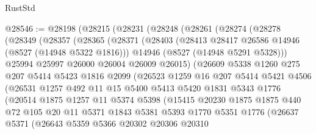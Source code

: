 \begin{lexlean}{RustStd}
\begin{coremodule}
@28546 := @28198
    (@28215
      (@28231
        (@28248
          (@28261
            (@28274
              (@28278
                (@28349
                  (@28357
                    (@28365
                      (@28371
                        (@28403
                          (@28413 @28417 @26586 @14946 (@8527 (@14948 @5322 @1816)))
                          @14946
                          (@8527 (@14948 @5291 @5328)))
                        @25994
                        @25997
                        @26000
                        @26004
                        @26009
                        @26015)
                      (@26609
                        @5338
                        @1260
                        @275
                        @207
                        @5414
                        @5423
                        @1816
                        @2099
                        (@26523
                          @1259
                          @16
                          @207
                          @5414
                          @5421
                          @4506
                          (@26531
                            @1257
                            @492
                            @11
                            @15
                            @5400
                            @5413
                            @5420
                            @1831
                            @5343
                            @1776
                            (@20514
                              @1875
                              @1257
                              @11
                              @5374
                              @5398
                              (@15415
                                @20230
                                @1875
                                @1875
                                @440
                                @72
                                @105
                                @20
                                @11
                                @5371
                                @1843
                                @5381
                                @5393
                                @1770
                                @5351
                                @1776
                                (@26637
                                  @5371
                                  (@26643
                                    @5359
                                    @5366
                                    @20302
                                    @20306
                                    @20310

\end{coremodule}
\end{lexlean}
